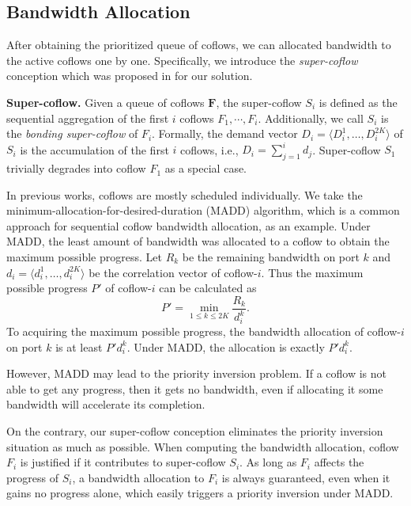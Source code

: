 \documentclass[10pt, conference, letterpaper]{IEEEtran}
\begin{document}
\subsection{Bandwidth Allocation}
After obtaining the prioritized queue of coflows, we can allocated bandwidth to the active coflows one by one. Specifically, we introduce the \emph{super-coflow} conception which was proposed in \cite{utopia} for our solution.

\noindent \textbf{Super-coflow.} Given a queue of coflows $\mathbf{F}$, the super-coflow $S_i$ is defined as the sequential aggregation of the first $i$ coflows $F_1,\cdots,F_i$. Additionally, we call $S_i$ is the \emph{bonding super-coflow} of $F_i$. Formally, the demand vector $D_i = \langle D_i^1,\dots,D_i^{2K} \rangle$ of $S_i$ is the accumulation of the first $i$ coflows, i.e., $D_i = \sum_{j=1}^id_j$. Super-coflow $S_1$ trivially degrades into coflow $F_1$ as a special case.

In previous works, coflows are mostly scheduled individually. We take the minimum-allocation-for-desired-duration (MADD) algorithm, which is a common approach for sequential coflow bandwidth allocation, as an example\cite{varys, orchestra}. Under MADD, the least amount of bandwidth was allocated to a coflow to obtain the maximum possible progress. Let $R_k$ be the remaining bandwidth on port $k$ and $d_i=\langle d_i^1,\dots,d_i^{2K}\rangle$ be the correlation vector of coflow-$i$. Thus the maximum possible progress $P'$ of coflow-$i$ can be calculated as
\begin{equation}
	P' = \min_{1\leq k \leq 2K}\frac{R_k}{d_i^k}.
\end{equation}
To acquiring the maximum possible progress, the bandwidth allocation of coflow-$i$ on port $k$ is at least $P'd_i^k$. Under MADD, the allocation is exactly $P'd_i^k$. 

However, MADD may lead to the priority inversion problem. If a coflow is not able to get any progress, then it gets no bandwidth, even if allocating it some bandwidth will accelerate its completion.

\begin{figure}
	
\end{figure}


On the contrary, our super-coflow conception eliminates the priority inversion situation as much as possible. When computing the bandwidth allocation, coflow $F_i$ is justified if it contributes to super-coflow $S_i$. As long as $F_i$ affects the progress of $S_i$, a bandwidth allocation to $F_i$ is always guaranteed, even when it gains no progress alone, which easily triggers a priority inversion under MADD.
\end{document}
